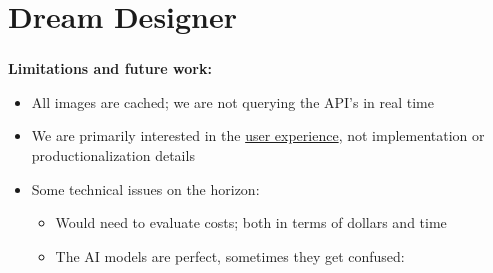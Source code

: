 \documentclass[t,xcolor={dvipsnames}]{beamer} %
\begin{document}
\section{Dream Designer}

\begin{frame}
\frametitle{\insertsection}
  \textbf{Limitations and future work:}
\vspace{0.2cm}

  \begin{itemize}
    \item<2-> All images are cached; we are not querying the API's in real time
    \item<2-> We are primarily interested in the \ul{user experience}, not
      implementation or productionalization details
    \item<3-> Some technical issues on the horizon:
      \begin{itemize}
        \item<4->[$\rightarrow$] Would need to evaluate costs; both in terms of
          dollars and time
        \item<5->[$\rightarrow$] The AI models are perfect, sometimes they get
          confused:
      \end{itemize}

  \end{itemize}


\end{frame}
\end{document}
